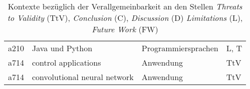 \begin{table}[h!]
\begin{tabular}{ r | p{7cm} | l | l }
        a210 & Java und Python & Programmiersprachen & L, T \\
        a714 & control applications & Anwendung & TtV \\
        a714 & convolutional neural network & Anwendung & TtV \\
    \end{tabular}
    \caption{Kontexte bezüglich der Verallgemeinbarkeit
    an den Stellen \textit{Threats to Validity} (TtV), \textit{Conclusion} (C), \textit{Discussion} (D)
    \textit{Limitations} (L), \textit{Future Work} (FW)
    }
    \label{table:kontexte-verallgemeinbarkeit}
\end{table}
